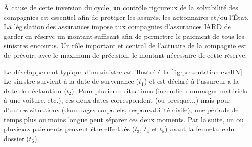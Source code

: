 À cause de cette inversion du cycle, un contrôle rigoureux de la
solvabilité des compagnies est essentiel afin de protéger les assurés,
les actionnaires et/ou l'État. La législation des assurances impose
aux compagnies d'assurances IARD de garder en réserve un montant
suffisant afin de permettre le paiement de tous les sinistres
encourus. Un rôle important et central de l'actuaire de la compagnie
est de prévoir, avec le maximum de précision, le montant nécessaire de
cette réserve.

Le développement typique d'un sinistre est illustré à la
\autoref{fig:presentation:evolIN}. Le sinistre survient à la date de survenance
($t_1$) et est déclaré à l'assureur à la date de déclaration
($t_2$). Pour plusieurs situations (incendie, dommages matériels à une
voiture, etc.), ces deux dates correspondent (ou presque...) mais pour
d'autres situations (dommages corporels, responsabilité civile), une
période de temps plus ou moins longue peut séparer ces deux
moments. Par la suite, un ou plusieurs paiements peuvent être
effectués ($t_3$, $t_4$ et $t_5$) avant la fermeture du dossier
($t_6$).

